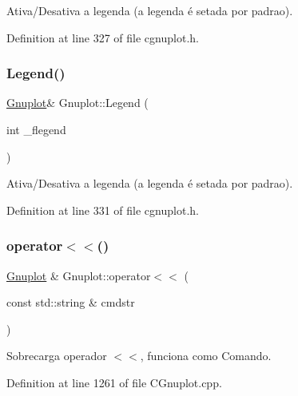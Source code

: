 Ativa/\+Desativa a legenda (a legenda é setada por padrao). 



Definition at line 327 of file cgnuplot.\+h.

\mbox{\label{class_gnuplot_a781ffec9b2ddd9706823b865acb95d0b}} 
\subsubsection{\texorpdfstring{Legend()}{Legend()}\hspace{0.1cm}{\footnotesize\ttfamily [2/2]}}
{\footnotesize\ttfamily \hyperlink{class_gnuplot}{Gnuplot}\& Gnuplot\+::\+Legend (\begin{DoxyParamCaption}\item[{int}]{\+\_\+flegend }\end{DoxyParamCaption})\hspace{0.3cm}{\ttfamily [inline]}}



Ativa/\+Desativa a legenda (a legenda é setada por padrao). 



Definition at line 331 of file cgnuplot.\+h.

\mbox{\label{class_gnuplot_ae56495dc15f23d32f099129d3a50dd6c}} 
\subsubsection{\texorpdfstring{operator$<$$<$()}{operator<<()}}
{\footnotesize\ttfamily \hyperlink{class_gnuplot}{Gnuplot} \& Gnuplot\+::operator$<$$<$ (\begin{DoxyParamCaption}\item[{const std\+::string \&}]{cmdstr }\end{DoxyParamCaption})}



Sobrecarga operador $<$$<$, funciona como Comando. 



Definition at line 1261 of file C\+Gnuplot.\+cpp.

\mbox{\label{class_gnuplot_a3920eab5d6595ea80d4bc4f72b06dab1}} 

